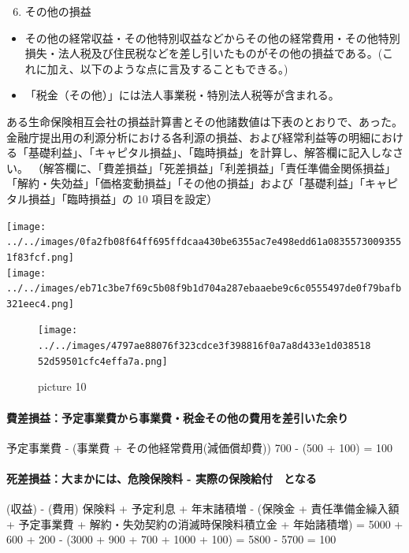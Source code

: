 \documentclass[report,gutter=10mm,fore-edge=10mm,uplatex,dvipdfmx]{jlreq}
\begin{document}
\begin{enumerate}
\setcounter{enumi}{5}
\tightlist
\item
  その他の損益
\end{enumerate}

\begin{itemize}
\tightlist
\item
  その他の経常収益・その他特別収益などからその他の経常費用・その他特別損失・法人税及び住民税などを差し引いたものがその他の損益である。(これに加え、以下のような点に言及することもできる。)
\item
  「税金（その他）」には法人事業税・特別法人税等が含まれる。
\end{itemize}


ある生命保険相互会社の損益計算書とその他諸数値は下表のとおりで、あった。金融庁提出用の利源分析における各利源の損益、および経常利益等の明細における「基礎利益」、「キャピタル損益」、「臨時損益」を計算し、解答欄に記入しなさい。
（解答欄に、「費差損益」「死差損益」「利差損益」「責任準備金関係損益」「解約・失効益」「価格変動損益」「その他の損益」および「基礎利益」「キャピタル損益」「臨時損益」の
10 項目を設定）

\texttt{[image: ../../images/0fa2fb08f64ff695ffdcaa430be6355ac7e498edd61a08355730093551f83fcf.png]}\\
\texttt{[image: ../../images/eb71c3be7f69c5b08f9b1d704a287ebaaebe9c6c0555497de0f79bafb321eec4.png]}


\begin{figure}
\centering
\texttt{[image: ../../images/4797ae88076f323cdce3f398816f0a7a8d433e1d03851852d59501cfc4effa7a.png]}
\caption{picture 10}
\end{figure}

\paragraph{費差損益：予定事業費から事業費・税金その他の費用を差引いた余り}

予定事業費 - (事業費 + その他経常費用(減価償却費)) 700 - (500 + 100) =
100

\paragraph{死差損益：大まかには、危険保険料 -
実際の保険給付　となる}

(収益) - (費用) 保険料 + 予定利息 + 年末諸積増 - (保険金 +
責任準備金繰入額 + 予定事業費 + 解約・失効契約の消滅時保険料積立金 +
年始諸積増) = 5000 + 600 + 200 - (3000 + 900 + 700 + 1000 + 100) = 5800
- 5700 = 100
\end{document}
